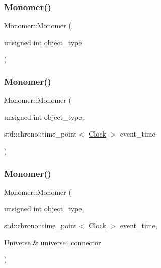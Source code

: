 \mbox{\label{classMonomer_af2249bf76132ee3802eaccb49b76fb96}} 
\subsubsection{\texorpdfstring{Monomer()}{Monomer()}\hspace{0.1cm}{\footnotesize\ttfamily [2/4]}}
{\footnotesize\ttfamily Monomer\+::\+Monomer (\begin{DoxyParamCaption}\item[{unsigned int}]{object\+\_\+type }\end{DoxyParamCaption})\hspace{0.3cm}{\ttfamily [inline]}}

\mbox{\label{classMonomer_acab23e1c41e236417492da5c1e617b1a}} 
\subsubsection{\texorpdfstring{Monomer()}{Monomer()}\hspace{0.1cm}{\footnotesize\ttfamily [3/4]}}
{\footnotesize\ttfamily Monomer\+::\+Monomer (\begin{DoxyParamCaption}\item[{unsigned int}]{object\+\_\+type,  }\item[{std\+::chrono\+::time\+\_\+point$<$ \mbox{\hyperlink{universe_8h_a0ef8d951d1ca5ab3cfaf7ab4c7a6fd80}{Clock}} $>$}]{event\+\_\+time }\end{DoxyParamCaption})\hspace{0.3cm}{\ttfamily [inline]}}

\mbox{\label{classMonomer_ae2b80466a0e724125aee173df34d1a6c}} 
\subsubsection{\texorpdfstring{Monomer()}{Monomer()}\hspace{0.1cm}{\footnotesize\ttfamily [4/4]}}
{\footnotesize\ttfamily Monomer\+::\+Monomer (\begin{DoxyParamCaption}\item[{unsigned int}]{object\+\_\+type,  }\item[{std\+::chrono\+::time\+\_\+point$<$ \mbox{\hyperlink{universe_8h_a0ef8d951d1ca5ab3cfaf7ab4c7a6fd80}{Clock}} $>$}]{event\+\_\+time,  }\item[{\mbox{\hyperlink{classUniverse}{Universe}} \&}]{universe\+\_\+connector }\end{DoxyParamCaption})\hspace{0.3cm}{\ttfamily [inline]}}

